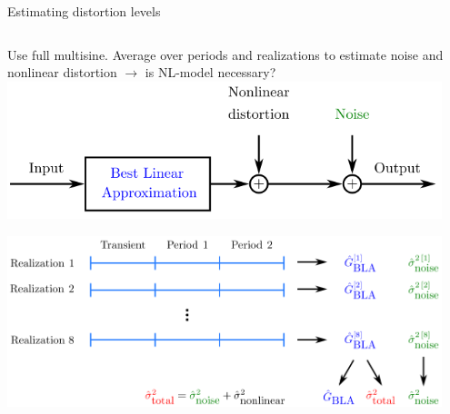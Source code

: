 \documentclass[9pt]{beamer}
\begin{document}
\begin{frame}{Estimating distortion levels}
  \begin{columns}
    \begin{column}{0.5\textwidth}
      Use full multisine. Average over periods and realizations to estimate noise
      and nonlinear distortion $\rightarrow$ is NL-model necessary?\\

      \includegraphics[width=0.99\textwidth]{fig/bla_nldistort}

      \vspace*{5mm}

      \includegraphics[width=0.99\textwidth]{fig/ms_nldistort}
    \end{column}
    \begin{column}{0.5\textwidth}
      \vspace{-5mm}


\end{column}
\end{columns}
\end{frame}
\end{document}
